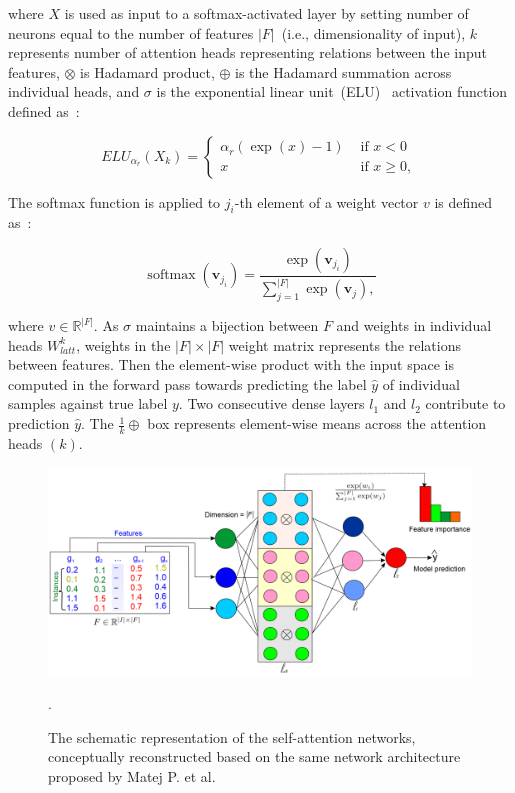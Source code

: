 \hspace*{3.5mm} where $X$ is used as input to a softmax-activated layer by setting number of neurons equal to the number of features $|F|$~(i.e., dimensionality of input), $k$ represents number of attention heads representing relations between the input features, $\otimes$ is Hadamard product, $\oplus$ is the Hadamard summation across individual heads, and $\sigma$ is the exponential linear unit~(ELU)~\cite{clevert2015fast} activation function defined as~\cite{clevert2015fast}: 

\begin{equation}
    ELU_{\alpha_r}(X_k)=\left\{\begin{array}{ll}
    \alpha_r(\exp (x)-1) & \text { if } x<0 \\
    x & \text { if } x \geq 0,
    \end{array}\right.
    \label{eq:elu_activation}
\end{equation}

\hspace*{3.5mm} The softmax function is applied to $j_{i}$-th element of a weight vector $v$ is defined as~\cite{vskrlj2020feature}:

\begin{equation}
    \operatorname{softmax}\left(\boldsymbol{v}_{j_{i}}\right)=\frac{\exp \left(\boldsymbol{v}_{j_{i}}\right)}{\sum_{j=1}^{|F|} \exp \left(\boldsymbol{v}_{j}\right),}
\end{equation}

\hspace*{3.5mm} where $v \in \mathbb{R}^{|F|}$. As $\sigma$ maintains a bijection between $F$ and weights in individual heads $W_{latt}^{k}$, weights in the $|F| \times|F|$ weight matrix represents the relations between features. Then the element-wise product with the input space is computed in the forward pass towards predicting the label $\hat{y}$ of individual samples against true label ${y}$. Two consecutive dense layers $l_{1}$ and $l_{2}$ contribute to prediction $\hat{y}$. The $\frac{1}{k} \oplus$ box represents element-wise means across the attention heads $(k)$. 

\begin{figure}
	\centering
	\includegraphics[scale=0.55]{images/san.png}	
	\caption{The schematic representation of the self-attention networks, conceptually reconstructed based on the same network architecture proposed by Matej P. et al.~\cite{vskrlj2020feature}}.
	\label{fig:san}
\end{figure}

